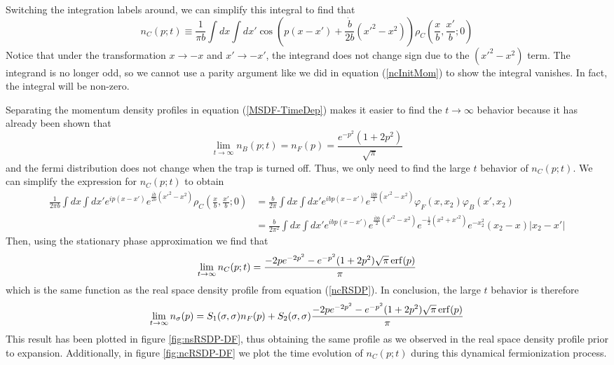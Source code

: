 \documentclass[onecolumn,english,aps,pra]{revtex4}
\begin{document}
Switching the integration labels around, we can simplify this integral to find that 
\begin{equation}
n_C(p;t) \equiv \frac{1}{\pi b} \int dx \int dx' \cos(p(x-x') + \frac{\dot{b}}{2b}(x'^2 - x^2))
\rho_C\left(\frac{x}{b},\frac{x'}{b};0\right)
\end{equation}
Notice that under the transformation $x\rightarrow -x$ and $x' \rightarrow -x'$, the integrand does not change sign due to the $(x'^2 -x^2)$ term. The integrand is no longer odd, so we cannot use a parity argument like we did in equation (\ref{ncInitMom}) to show the integral vanishes. In fact, the integral will be non-zero. 

Separating the momentum density profiles in equation (\ref{MSDF-TimeDep}) makes it  easier to find the $t \rightarrow \infty$ behavior because it has already been shown \cite{minguzzi2005exact} that
\begin{equation}
\lim_{t \rightarrow \infty} n_B(p;t) = n_F(p) = \frac{e^{-p^2}(1+2p^2)}{\sqrt{\pi}}
\end{equation}
and the fermi distribution does not change when the trap is turned off. Thus, we only need to find the large $t$ behavior of $n_C(p;t)$. We can simplify the expression for $n_C(p;t)$ to obtain
\begin{align*}
\frac{1}{2\pi b} \int dx \int dx' e^{ip(x-x')} e^{\frac{i\dot{b}}{2b}(x'^2 - x^2)}
\rho_C\left(\frac{x}{b},\frac{x'}{b};0\right) 
&= \frac{b}{2\pi} \int dx \int dx' e^{ibp(x-x')} e^{\frac{i\dot{b}b}{2}(x'^2 - x^2)}
\varphi_F(x,x_2)\varphi_B(x',x_2)\\
&= \frac{b}{2\pi^2} \int dx \int dx' e^{ibp(x-x')} e^{\frac{i\dot{b}b}{2}(x'^2 - x^2)}
e^{-\frac{1}{2}(x^2 + x'^2)}e^{-x_2^2} (x_2 -x)|x_2 - x'|
\end{align*}
Then, using the stationary phase approximation we find that
\begin{equation}
\lim_{t \rightarrow \infty} n_C(p;t) = \frac{-2pe^{-2p^2} - e^{-p^2}(1+2p^2)\sqrt{\pi}\erf(p)}{\pi}  
\end{equation}
which is the same function as the real space density profile from equation (\ref{ncRSDP}). In conclusion, the large $t$ behavior is therefore
\begin{equation}
\lim_{t \rightarrow \infty} n_\sigma(p) = S_1(\sigma, \sigma)n_F(p) + S_2(\sigma,\sigma) \frac{-2pe^{-2p^2} - e^{-p^2}(1+2p^2)\sqrt{\pi}\erf(p)}{\pi}
\end{equation} 
This result has been plotted in figure \ref{fig:nsRSDP-DF}, thus obtaining the same profile as we observed in the real space density profile prior to expansion. Additionally, in figure \ref{fig:ncRSDP-DF} we plot the time evolution of $n_C(p;t)$ during this dynamical fermionization process.
\end{document}
